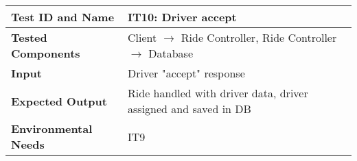 \vspace{2em}

\noindent\begin{tabular}{l p{}}
    \hline
    \textbf{Test ID and Name} & IT10: Driver accept\\
    \hline
    \textbf{Tested Components} & Client $\rightarrow$ Ride Controller, Ride Controller $\rightarrow$ Database\\
    \hline
    \textbf{Input} & Driver "accept" response\\
    \hline
    \textbf{Expected Output} & Ride handled with driver data, driver assigned and saved in DB\\
    \hline
    \textbf{Environmental Needs} & IT9\\
    \hline
\end{tabular}